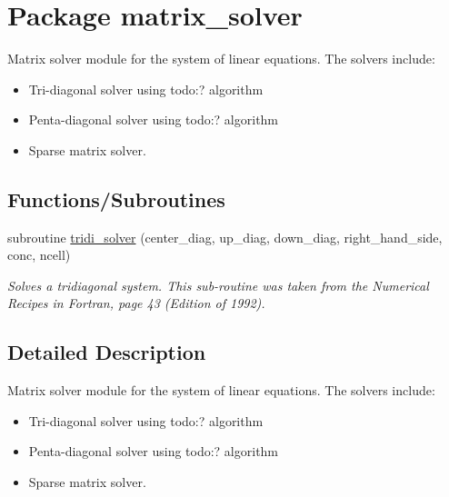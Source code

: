 \hypertarget{a00066}{
\section{Package matrix\_\-solver}
\label{a00066}
}
Matrix solver module for the system of linear equations. The solvers include:\begin{itemize}
\item Tri-diagonal solver using todo:? algorithm\item Penta-diagonal solver using todo:? algorithm\item Sparse matrix solver. \end{itemize}
 


\subsection*{Functions/Subroutines}
\begin{CompactItemize}
\item 
subroutine \hyperlink{a00066_f8a75322afb36d15bb848db092161abd}{tridi\_\-solver} (center\_\-diag, up\_\-diag, down\_\-diag, right\_\-hand\_\-side, conc, ncell)
\begin{CompactList}\small\item\em Solves a tridiagonal system. This sub-routine was taken from the Numerical Recipes in Fortran, page 43 (Edition of 1992). \item\end{CompactList}\end{CompactItemize}


\subsection{Detailed Description}
Matrix solver module for the system of linear equations. The solvers include:\begin{itemize}
\item Tri-diagonal solver using todo:? algorithm\item Penta-diagonal solver using todo:? algorithm\item Sparse matrix solver. \end{itemize}




